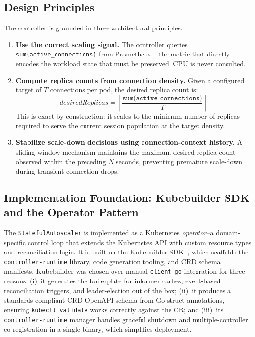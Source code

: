 \documentclass[twocolumn]{svjour3}
\begin{document}
\subsection{Design Principles}

The controller is grounded in three architectural principles:

\begin{enumerate}[leftmargin=*]
\item \textbf{Use the correct scaling signal.} The controller queries
  \texttt{sum(active\_connections)} from Prometheus -- the metric that directly encodes the
  workload state that must be preserved. CPU is never consulted.

\item \textbf{Compute replica counts from connection density.} Given a configured target of
  $T$ connections per pod, the desired replica count is:
  \begin{equation}
  \textit{desiredReplicas} = \left\lceil \frac{\texttt{sum(active\_connections)}}{T} \right\rceil
  \label{eq:stateful}
  \end{equation}
  This is exact by construction: it scales to the minimum number of replicas required to
  serve the current session population at the target density.

\item \textbf{Stabilize scale-down decisions using connection-context history.} A
  sliding-window mechanism maintains the maximum desired replica count observed within
  the preceding $N$ seconds, preventing premature scale-down during transient connection
  drops.
\end{enumerate}

\subsection{Implementation Foundation: Kubebuilder SDK and the Operator Pattern}

The \texttt{StatefulAutoscaler} is implemented as a Kubernetes \textit{operator}--a
domain-specific control loop that extends the Kubernetes API with custom resource types and
reconciliation logic. It is built on the Kubebuilder SDK~\cite{kubebuilder_docs}, which
scaffolds the \texttt{controller-runtime} library, code generation tooling, and CRD schema
manifests. Kubebuilder was chosen over manual \texttt{client-go} integration for three
reasons: (i)~it generates the boilerplate for informer caches, event-based reconciliation
triggers, and leader-election out of the box; (ii)~it produces a standards-compliant CRD
OpenAPI schema from Go struct annotations, ensuring \texttt{kubectl validate} works
correctly against the CR; and (iii)~its \texttt{controller-runtime} manager handles graceful
shutdown and multiple-controller co-registration in a single binary, which simplifies
deployment.
\end{document}
